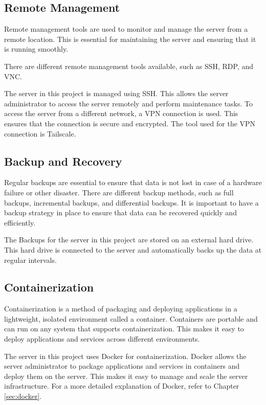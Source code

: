 \subsection{Remote Management}

Remote management tools are used to monitor and manage the server from a remote location.
This is essential for maintaining the server and ensuring that it is running smoothly.

There are different remote management tools available, such as SSH, RDP, and VNC. 

The server in this project is managed using SSH. This allows the server administrator to access the server remotely and perform maintenance tasks.
To access the server from a different network, a VPN connection is used. This ensures that the connection is secure and encrypted.
The tool used for the VPN connection is Tailscale.

\subsection{Backup and Recovery}

Regular backups are essential to ensure that data is not lost in case of a hardware failure or other disaster.
There are different backup methods, such as full backups, incremental backups, and differential backups.
It is important to have a backup strategy in place to ensure that data can be recovered quickly and efficiently.

The Backups for the server in this project are stored on an external hard drive. This hard drive is connected to the server and automatically backs up the data at regular intervals.


\subsection{Containerization}

Containerization is a method of packaging and deploying applications in a lightweight, isolated environment called a container.
Containers are portable and can run on any system that supports containerization.
This makes it easy to deploy applications and services across different environments.

The server in this project uses Docker for containerization. Docker allows the server administrator to package applications and services in containers and deploy them on the server.
This makes it easy to manage and scale the server infrastructure. For a more detailed explanation of Docker, refer to Chapter \ref{sec:docker}.

